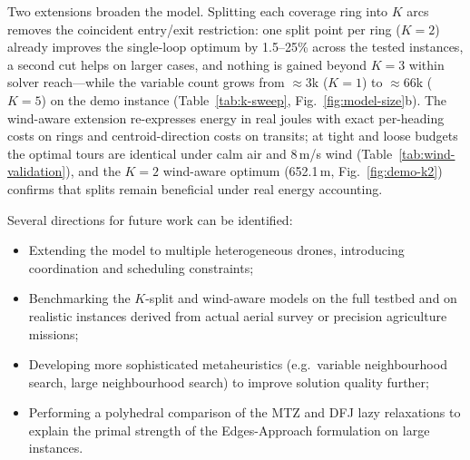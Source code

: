 \documentclass[12pt]{elsarticle}
\begin{document}
Two extensions broaden the model. Splitting each coverage ring into $K$ arcs removes the coincident entry/exit restriction: one split point per ring ($K=2$) already improves the single-loop optimum by 1.5--25\% across the tested instances, a second cut helps on larger cases, and nothing is gained beyond $K=3$ within solver reach---while the variable count grows from $\approx$3k ($K=1$) to $\approx$66k ($K=5$) on the demo instance (Table~\ref{tab:k-sweep}, Fig.~\ref{fig:model-size}b). The wind-aware extension re-expresses energy in real joules with exact per-heading costs on rings and centroid-direction costs on transits; at tight and loose budgets the optimal tours are identical under calm air and 8\,m/s wind (Table~\ref{tab:wind-validation}), and the $K=2$ wind-aware optimum (652.1\,m, Fig.~\ref{fig:demo-k2}) confirms that splits remain beneficial under real energy accounting.

Several directions for future work can be identified:
\begin{itemize}
    \item Extending the model to multiple heterogeneous drones, introducing coordination and scheduling constraints;
    \item Benchmarking the $K$-split and wind-aware models on the full testbed and on realistic instances derived from actual aerial survey or precision agriculture missions;
    \item Developing more sophisticated metaheuristics (e.g.\ variable neighbourhood search, large neighbourhood search) to improve solution quality further;
    \item Performing a polyhedral comparison of the MTZ and DFJ lazy relaxations to explain the primal strength of the Edges-Approach formulation on large instances.
\end{itemize}

\newpage

\end{document}
